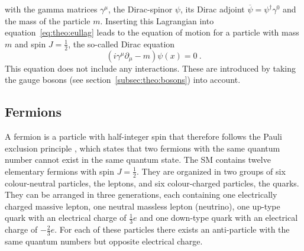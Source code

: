 with the gamma matrices $\gamma^\mu$, the Dirac-spinor $\psi$, its Dirac adjoint $\overline{\psi}=\psi^\dagger \gamma^0$ and the mass of the particle $m$. Inserting this Lagrangian into equation~\ref{eq:theo:eullag} leads to the equation of motion for a particle with mass $m$ and spin $J=\frac{1}{2}$, the so-called Dirac equation
\begin{equation}
\left(i\gamma^\mu\partial_\mu-m\right)\psi(x)=0 ~.
\end{equation}
This equation does not include any interactions. These are introduced by taking the gauge bosons (see section~\ref{subsec:theo:bosons}) into account.\\

\subsection{Fermions}
A fermion is a particle with half-integer spin that therefore follows the Pauli exclusion principle \cite{pauli}, which states that two fermions with the same quantum number cannot exist in the same quantum state. The SM contains twelve elementary fermions with spin $J=\frac{1}{2}$. They are organized in two groups of six colour-neutral particles, the leptons, and six colour-charged particles, the quarks. They can be arranged in three generations, each containing one electrically charged massive lepton, one neutral massless lepton (neutrino), one up-type quark with an electrical charge of $\frac{1}{3}e$ and one down-type quark with an electrical charge of $-\frac{2}{3}e$. For each of these particles there exists an anti-particle with the same quantum numbers but opposite electrical charge.\\
 
